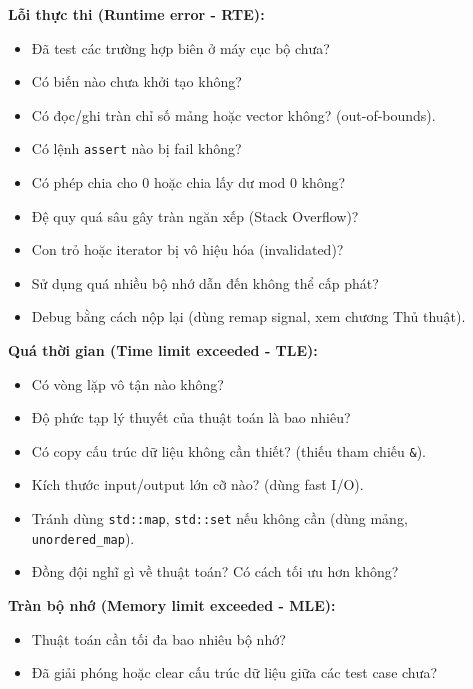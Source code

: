 \textbf{Lỗi thực thi (Runtime error - RTE):}
\begin{itemize}[noitemsep,topsep=0pt,leftmargin=1.2em]
	\item Đã test các trường hợp biên ở máy cục bộ chưa?
	\item Có biến nào chưa khởi tạo không?
	\item Có đọc/ghi tràn chỉ số mảng hoặc vector không? (out-of-bounds).
	\item Có lệnh \texttt{assert} nào bị fail không?
	\item Có phép chia cho 0 hoặc chia lấy dư mod 0 không?
	\item Đệ quy quá sâu gây tràn ngăn xếp (Stack Overflow)?
	\item Con trỏ hoặc iterator bị vô hiệu hóa (invalidated)?
	\item Sử dụng quá nhiều bộ nhớ dẫn đến không thể cấp phát?
	\item Debug bằng cách nộp lại (dùng remap signal, xem chương Thủ thuật).
\end{itemize}

\textbf{Quá thời gian (Time limit exceeded - TLE):}
\begin{itemize}[noitemsep,topsep=0pt,leftmargin=1.2em]
	\item Có vòng lặp vô tận nào không?
	\item Độ phức tạp lý thuyết của thuật toán là bao nhiêu?
	\item Có copy cấu trúc dữ liệu không cần thiết? (thiếu tham chiếu \texttt{\&}).
	\item Kích thước input/output lớn cỡ nào? (dùng fast I/O).
	\item Tránh dùng \texttt{std::map}, \texttt{std::set} nếu không cần (dùng mảng, \texttt{unordered\_map}).
	\item Đồng đội nghĩ gì về thuật toán? Có cách tối ưu hơn không?
\end{itemize}

\textbf{Tràn bộ nhớ (Memory limit exceeded - MLE):}
\begin{itemize}[noitemsep,topsep=0pt,leftmargin=1.2em]
	\item Thuật toán cần tối đa bao nhiêu bộ nhớ?
	\item Đã giải phóng hoặc clear cấu trúc dữ liệu giữa các test case chưa?
\end{itemize}
